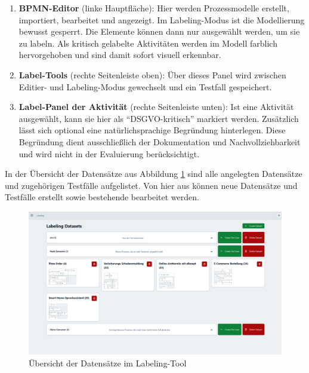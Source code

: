 \begin{enumerate}
    \item \textbf{BPMN-Editor} (linke Hauptfläche): Hier werden Prozessmodelle erstellt, importiert, bearbeitet und angezeigt. Im Labeling-Modus ist die Modellierung bewusst gesperrt. Die Elemente können dann nur ausgewählt werden, um sie zu labeln. Als kritisch gelabelte Aktivitäten werden im Modell farblich hervorgehoben und sind damit sofort visuell erkennbar.
    \item \textbf{Label-Tools} (rechte Seitenleiste oben): Über dieses Panel wird zwischen Editier- und Labeling-Modus gewechselt und ein Testfall gespeichert.
    \item \textbf{Label-Panel der Aktivität} (rechte Seitenleiste unten): Ist eine Aktivität ausgewählt, kann sie hier als \enquote{DSGVO-kritisch} markiert werden. Zusätzlich lässt sich optional eine natürlichsprachige Begründung hinterlegen. Diese Begründung dient ausschließlich der Dokumentation und Nachvollziehbarkeit und wird nicht in der Evaluierung berücksichtigt.
\end{enumerate}

In der Übersicht der Datensätze aus Abbildung \ref{fig:labeling-datasets} sind alle angelegten Datensätze und zugehörigen Testfälle aufgelistet. Von hier aus können neue Datensätze und Testfälle erstellt sowie bestehende bearbeitet werden.

\begin{figure}[h]
    \centering
    \includegraphics[width=\textwidth]{images/labeling/labeling-datasets}
    \caption{Übersicht der Datensätze im Labeling-Tool}
    \label{fig:labeling-datasets}
\end{figure}